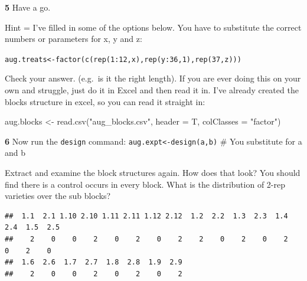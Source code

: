\documentclass[
]{book}
\makeatletter
\newenvironment{Shaded}{\begin{snugshade}}{\end{snugshade}}
\newcommand{\AttributeTok}[1]{\textcolor[rgb]{0.77,0.63,0.00}{#1}}
\newcommand{\DecValTok}[1]{\textcolor[rgb]{0.00,0.00,0.81}{#1}}
\newcommand{\FunctionTok}[1]{\textcolor[rgb]{0.00,0.00,0.00}{#1}}
\newcommand{\NormalTok}[1]{#1}
\newcommand{\OtherTok}[1]{\textcolor[rgb]{0.56,0.35,0.01}{#1}}
\newcommand{\SpecialCharTok}[1]{\textcolor[rgb]{0.00,0.00,0.00}{#1}}
\newcommand{\StringTok}[1]{\textcolor[rgb]{0.31,0.60,0.02}{#1}}
\newenvironment{kframe}{%
\medskip{}
\setlength{\fboxsep}{.8em}
 \def\at@end@of@kframe{}%
 \ifinner\ifhmode%
  \def\at@end@of@kframe{\end{minipage}}%
  \begin{minipage}{\columnwidth}%
 \fi\fi%
 \def\FrameCommand##1{\hskip\@totalleftmargin \hskip-\fboxsep
 \colorbox{shadecolor}{##1}\hskip-\fboxsep
     \hskip-\linewidth \hskip-\@totalleftmargin \hskip\columnwidth}%
 \MakeFramed {\advance\hsize-\width
   \@totalleftmargin\z@ \linewidth\hsize
   \@setminipage}}%
 {\par\unskip\endMakeFramed%
 \at@end@of@kframe}
\newenvironment{rmdblock}[1]
  {
  \begin{itemize}
  \renewcommand{\labelitemi}{
    \raisebox{-.7\height}[0pt][0pt]{
      {\setkeys{Gin}{width=3em,keepaspectratio}\texttt{[image: images/\#1]}}
    }
  }
  \setlength{\fboxsep}{1em}
  \begin{kframe}
  \item
  }
  {
  \end{kframe}
  \end{itemize}
  }
\newenvironment{rmdquiz}
  {\begin{rmdblock}{quiz}}
  {\end{rmdblock}}
\makeatother
\begin{document}
\begin{rmdquiz}
\textbf{5} Have a go.

Hint = I've filled in some of the options below. You have to substitute the correct numbers or parameters for x, y and z:

\texttt{aug.treats\textless{}-factor(c(rep(1:12,x),rep(y:36,1),rep(37,z)))}
\end{rmdquiz}

Check your answer. (e.g.~is it the right length). If you are ever doing this on your own and struggle, just do it in Excel and then read it in. I've already created the blocks structure in excel, so you can read it straight in:

\begin{Shaded}
\begin{Highlighting}[]
\NormalTok{aug.blocks }\OtherTok{\textless{}{-}} \FunctionTok{read.csv}\NormalTok{(}\StringTok{"aug\_blocks.csv"}\NormalTok{, }\AttributeTok{header =}\NormalTok{ T, }\AttributeTok{colClasses =} \StringTok{"factor"}\NormalTok{)}
\end{Highlighting}
\end{Shaded}

\begin{rmdquiz}
\textbf{6} Now run the \texttt{design} command:
\texttt{aug.expt\textless{}-design(a,b)} \# You substitute for a and b
\end{rmdquiz}

Extract and examine the block structures again. How does that look?
You should find there is a control occurs in every block. What is the distribution of 2-rep varieties over the sub blocks?

\begin{Shaded}
\end{Shaded}

\begin{verbatim}
##  1.1  2.1 1.10 2.10 1.11 2.11 1.12 2.12  1.2  2.2  1.3  2.3  1.4  2.4  1.5  2.5 
##    2    0    0    2    0    2    0    2    2    0    2    0    2    0    2    0 
##  1.6  2.6  1.7  2.7  1.8  2.8  1.9  2.9 
##    2    0    0    2    0    2    0    2
\end{verbatim}
\end{document}
